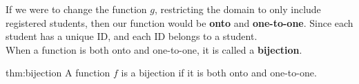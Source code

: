 \newpage

\noindent
If we were to change the function $g$, restricting the domain to only include
registered students, then our function would be \textbf{onto} and \textbf{one-to-one}. Since
each student has a unique ID, and each ID belongs to a student.\\

\noindent
When a function is both onto and one-to-one, it is called a \textbf{bijection}.\\

\begin{Def}[Bijection]{thm:bijection}
    A function $f$ is a bijection if it is both onto and one-to-one.
\end{Def}